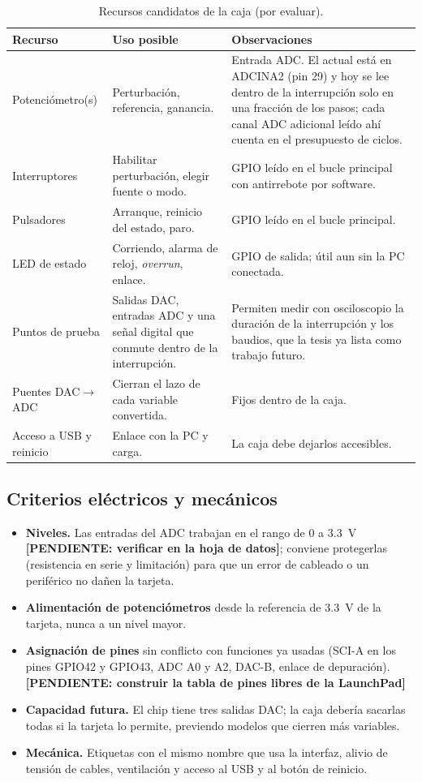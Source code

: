 \documentclass[12pt,letterpaper]{article}
\newcommand{\pendiente}[1]{\textbf{[PENDIENTE: #1]}}
\begin{document}
\begin{table}[!htbp]
\centering
\caption{Recursos candidatos de la caja (por evaluar).}
\label{tab:recursos}
\begin{tabularx}{\textwidth}{>{\raggedright\arraybackslash}p{2.9cm}>{\raggedright\arraybackslash}p{3.3cm}Y}
\toprule
\textbf{Recurso} & \textbf{Uso posible} & \textbf{Observaciones} \\
\midrule
Potenciómetro(s) & Perturbación, referencia, ganancia. & Entrada ADC. El actual está en ADCINA2 (pin 29) y hoy se lee dentro de la interrupción solo en una fracción de los pasos; cada canal ADC adicional leído ahí cuenta en el presupuesto de ciclos. \\
Interruptores & Habilitar perturbación, elegir fuente o modo. & GPIO leído en el bucle principal con antirrebote por software. \\
Pulsadores & Arranque, reinicio del estado, paro. & GPIO leído en el bucle principal. \\
LED de estado & Corriendo, alarma de reloj, \textit{overrun}, enlace. & GPIO de salida; útil aun sin la PC conectada. \\
Puntos de prueba & Salidas DAC, entradas ADC y una señal digital que conmute dentro de la interrupción. & Permiten medir con osciloscopio la duración de la interrupción y los baudios, que la tesis ya lista como trabajo futuro. \\
Puentes DAC$\rightarrow$ADC & Cierran el lazo de cada variable convertida. & Fijos dentro de la caja. \\
Acceso a USB y reinicio & Enlace con la PC y carga. & La caja debe dejarlos accesibles. \\
\bottomrule
\end{tabularx}
\end{table}

\subsection{Criterios eléctricos y mecánicos}

\begin{itemize}
    \item \textbf{Niveles.} Las entradas del ADC trabajan en el rango de 0 a 3.3~V \pendiente{verificar en la hoja de datos}; conviene protegerlas (resistencia en serie y limitación) para que un error de cableado o un periférico no dañen la tarjeta.
    \item \textbf{Alimentación de potenciómetros} desde la referencia de 3.3~V de la tarjeta, nunca a un nivel mayor.
    \item \textbf{Asignación de pines} sin conflicto con funciones ya usadas (SCI-A en los pines GPIO42 y GPIO43, ADC A0 y A2, DAC-B, enlace de depuración). \pendiente{construir la tabla de pines libres de la LaunchPad}
    \item \textbf{Capacidad futura.} El chip tiene tres salidas DAC; la caja debería sacarlas todas si la tarjeta lo permite, previendo modelos que cierren más variables.
    \item \textbf{Mecánica.} Etiquetas con el mismo nombre que usa la interfaz, alivio de tensión de cables, ventilación y acceso al USB y al botón de reinicio.
\end{itemize}
\end{document}
